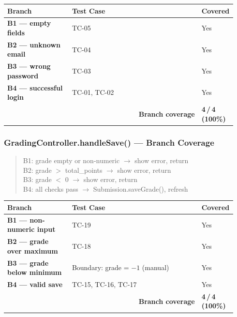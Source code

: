 \documentclass[12pt, a4paper]{article}
\newcommand{\fcolplain}[1]{\textbf{#1}}
\begin{document}
\begin{center}
\begin{tabular}{@{}p{0.28\linewidth}p{0.56\linewidth}p{0.10\linewidth}@{}}
  \toprule
  \fcolplain{Branch} & Test Case & Covered \\
  \midrule
  \fcolplain{B1 --- empty fields} & TC-05                  & Yes \\
  \fcolplain{B2 --- unknown email} & TC-04                  & Yes \\
  \fcolplain{B3 --- wrong password} & TC-03                  & Yes \\
  \fcolplain{B4 --- successful login} & TC-01, TC-02           & Yes \\
  \midrule
  \multicolumn{2}{r}{\textbf{Branch coverage}} & \textbf{4\,/\,4 (100\%)} \\
  \bottomrule
\end{tabular}
\end{center}

\subsubsection*{GradingController.handleSave() --- Branch Coverage}
\begin{quote}\small\ttfamily
B1: grade empty or non-numeric \hfill $\to$ show error, return\\
B2: grade $>$ total\_points \hfill $\to$ show error, return\\
B3: grade $<$ 0 \hfill $\to$ show error, return\\
B4: all checks pass \hfill $\to$ Submission.saveGrade(), refresh
\end{quote}

\begin{center}
\begin{tabular}{@{}p{0.28\linewidth}p{0.56\linewidth}p{0.10\linewidth}@{}}
  \toprule
  \fcolplain{Branch} & Test Case & Covered \\
  \midrule
  \fcolplain{B1 --- non-numeric input} & TC-19                        & Yes \\
  \fcolplain{B2 --- grade over maximum} & TC-18                        & Yes \\
  \fcolplain{B3 --- grade below minimum} & Boundary: grade = $-1$ (manual) & Yes \\
  \fcolplain{B4 --- valid save} & TC-15, TC-16, TC-17          & Yes \\
  \midrule
  \multicolumn{2}{r}{\textbf{Branch coverage}} & \textbf{4\,/\,4 (100\%)} \\
  \bottomrule
\end{tabular}
\end{center}
\end{document}
